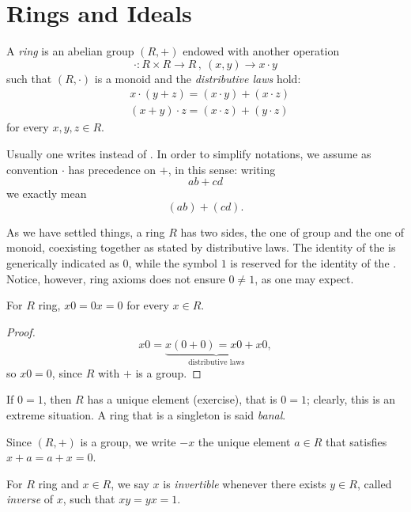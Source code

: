 
\section{Rings and Ideals}

\begin{definition}[Rings]
A {\em ring} is an abelian group \((R, +)\) endowed with another operation
\[\cdot : R \times R \to R\,, \ (x, y) \to x \cdot y\] such that \((R, \cdot)\) is a monoid and the {\em distributive laws} hold:
\begin{align*}
& x \cdot (y+z) = (x \cdot y) + (x \cdot z) \\
& (x+y) \cdot z = (x \cdot z) + (y \cdot z)
\end{align*}
for every \(x, y, z \in R\).
\end{definition}

Usually one writes  instead of . In order to simplify notations, we assume as convention \(\cdot\) has precedence on \(+\), in this sense: writing
\[ab + cd\]
we exactly mean
\[(ab) + (cd) .\]

As we have settled things, a ring \(R\) has two sides, the one of group and the one of monoid, coexisting together as stated by distributive laws. The identity of the  is generically indicated as \(0\), while the symbol \(1\) is reserved for the identity of the . Notice, however, ring axioms does not ensure \(0 \ne 1\), as one may expect.

\begin{lemma}
For \(R\) ring, \(x 0 = 0 x = 0\) for every \(x \in R\).
\end{lemma}

\begin{proof}
\[x 0 = \underbrace{x (0+0) = x0 + x0}_{\text{distributive laws}},\]
so \(x0 = 0\), since \(R\) with \(+\) is a group.
\end{proof}

If \(0 = 1\), then \(R\) has a unique element (exercise), that is \(0 = 1\); clearly, this is an extreme situation. A ring that is a singleton is said {\em banal}.

Since \((R, +)\) is a group, we write \(-x\) the unique element \(a \in R\) that satisfies \(x + a = a + x = 0\).

\begin{definition}
For \(R\) ring and \(x \in R\), we say \(x\) is {\em invertible} whenever there exists \(y \in R\), called {\em inverse} of \(x\), such that \(xy = yx = 1\).
\end{definition}

